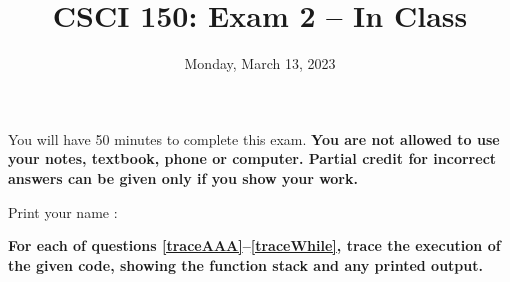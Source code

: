 \documentclass{article}
\begin{document}
\title{CSCI 150: Exam 2 -- In Class}
\author{}
\date{Monday, March 13, 2023}

\maketitle

\thispagestyle{empty}

 You will have 50
minutes to complete this exam. \textbf{You are not allowed to use your
  notes, textbook, phone or computer.  Partial credit for incorrect answers can be given only
  if you show your work.}  \bigskip

  \vspace{0.3in}

Print your name : \underline{\phantom{XXXXXXXXXXXXXXXXXXXXXXXXX}}
\vspace{1in}



\newpage

\textbf{For each of questions \ref{traceAAA}--\ref{traceWhile}, trace
  the execution of the given code, showing the function stack and any
  printed output.}
\end{document}
